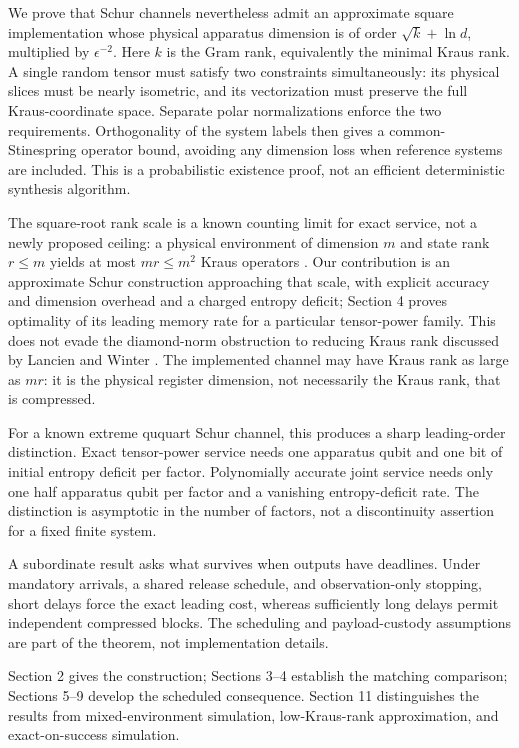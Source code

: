 \documentclass[11pt,a4paper]{article}
\numberwithin{equation}{section}
\begin{document}
We prove that Schur channels nevertheless admit an approximate square
implementation whose physical apparatus dimension is of order
\(\sqrt{k}+\ln d\), multiplied by \(\epsilon^{-2}\). Here \(k\) is the
Gram rank, equivalently the minimal Kraus rank. A single random tensor
must satisfy two constraints simultaneously: its physical slices must be
nearly isometric, and its vectorization must preserve the full
Kraus-coordinate space. Separate polar normalizations enforce the two
requirements. Orthogonality of the system labels then gives a
common-Stinespring operator bound, avoiding any dimension loss when
reference systems are included. This is a probabilistic existence proof,
not an efficient deterministic synthesis algorithm.

The square-root rank scale is a known counting limit for exact service,
not a newly proposed ceiling: a physical environment of dimension \(m\)
and state rank \(r\le m\) yields at most \(mr\le m^2\) Kraus operators
\citep{terhal1999}. Our contribution is an approximate Schur
construction approaching that scale, with explicit accuracy and
dimension overhead and a charged entropy deficit; Section 4 proves
optimality of its leading memory rate for a particular tensor-power
family. This does not evade the diamond-norm obstruction to reducing
Kraus rank discussed by Lancien and Winter \citep{lancien2024}. The
implemented channel may have Kraus rank as large as \(mr\): it is the
physical register dimension, not necessarily the Kraus rank, that is
compressed.

For a known extreme ququart Schur channel, this produces a sharp
leading-order distinction. Exact tensor-power service needs one
apparatus qubit and one bit of initial entropy deficit per factor.
Polynomially accurate joint service needs only one half apparatus qubit
per factor and a vanishing entropy-deficit rate. The distinction is
asymptotic in the number of factors, not a discontinuity assertion for a
fixed finite system.

A subordinate result asks what survives when outputs have deadlines.
Under mandatory arrivals, a shared release schedule, and
observation-only stopping, short delays force the exact leading cost,
whereas sufficiently long delays permit independent compressed blocks.
The scheduling and payload-custody assumptions are part of the theorem,
not implementation details.

Section 2 gives the construction; Sections 3--4 establish the matching
comparison; Sections 5--9 develop the scheduled consequence. Section 11
distinguishes the results from mixed-environment simulation,
low-Kraus-rank approximation, and exact-on-success simulation.
\end{document}
